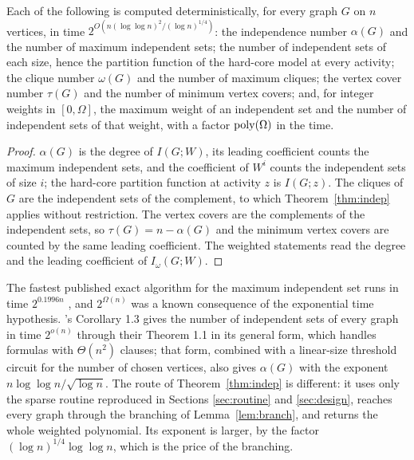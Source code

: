 \begin{corollary}\label{cor:indep}
Each of the following is computed deterministically, for every graph $G$ on $n$
vertices, in time $2^{O(n(\log\log n)^2/(\log n)^{1/4})}$: the independence
number $\alpha(G)$ and the number of maximum independent sets; the number of
independent sets of each size, hence the partition function of the hard-core
model at every activity; the clique number $\omega(G)$ and the number of maximum
cliques; the vertex cover number $\tau(G)$ and the number of minimum vertex
covers; and, for integer weights in $[0,\Omega]$, the maximum weight of an
independent set and the number of independent sets of that weight, with a factor
$\operatorname{poly}(\Omega)$ in the time.
\end{corollary}

\begin{proof}
$\alpha(G)$ is the degree of $I(G;W)$, its leading coefficient counts the maximum
independent sets, and the coefficient of $W^{i}$ counts the independent sets of
size $i$; the hard-core partition function at activity $z$ is $I(G;z)$. The
cliques of $G$ are the independent sets of the complement, to which
Theorem~\ref{thm:indep} applies without restriction. The vertex covers are the
complements of the independent sets, so $\tau(G)=n-\alpha(G)$ and the minimum
vertex covers are counted by the same leading coefficient. The weighted
statements read the degree and the leading coefficient of $I_\omega(G;W)$.
\end{proof}

\begin{remark}\label{rem:indep}
The fastest published exact algorithm for the maximum independent set runs in
time $2^{0.1996n}$ \cite{XN17}, and $2^{\Omega(n)}$ was a known consequence of
the exponential time hypothesis. \oai{}'s Corollary 1.3 gives the number of
independent sets of every graph in time $2^{o(n)}$ through their Theorem 1.1 in
its general form, which handles formulas with $\Theta(n^2)$ clauses; that form,
combined with a linear-size threshold circuit for the number of chosen vertices,
also gives $\alpha(G)$ with the exponent $n\log\log n/\sqrt{\log n}$. The route
of Theorem~\ref{thm:indep} is different: it uses only the sparse routine
reproduced in Sections \ref{sec:routine} and \ref{sec:design}, reaches every
graph through the branching of Lemma~\ref{lem:branch}, and returns the whole
weighted polynomial. Its exponent is larger, by the factor
$(\log n)^{1/4}\log\log n$, which is the price of the branching.
\end{remark}

